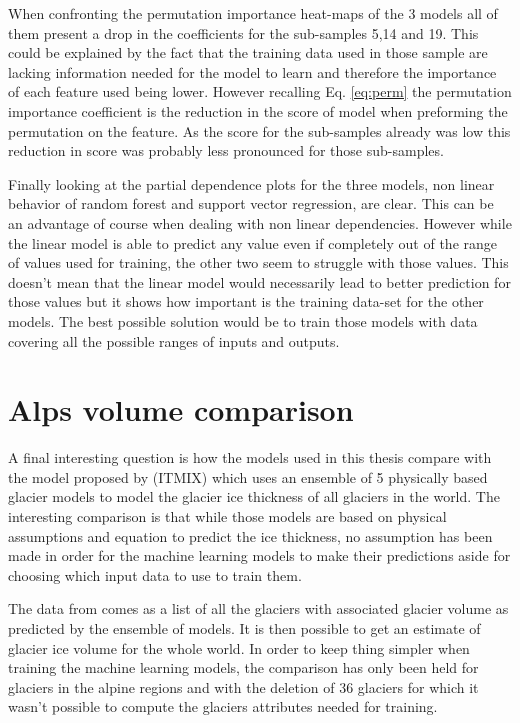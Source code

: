 When confronting the permutation importance heat-maps of the 3 models all of them present a drop in the coefficients for the sub-samples 5,14 and 19. This could be explained by the fact that the training data used in those sample are lacking information needed for the model to learn and therefore the importance of each feature used being lower. However recalling Eq. \ref{eq:perm} the permutation importance coefficient is the reduction in the score of model when preforming the permutation on the feature. As the score for the sub-samples already was low this reduction in score was probably less pronounced for those sub-samples. 

Finally looking at the partial dependence plots for the three models, non linear behavior of random forest and support vector regression, are clear. This can be an advantage of course when dealing with non linear dependencies. However while the linear model is able to predict any value even if completely out of the range of values used for training, the other two seem to struggle with those values. This doesn't mean that the linear model would necessarily lead to better prediction for those values but it shows how important is the training data-set for the other models. The best possible solution would be to train those models with data covering all the possible ranges of inputs and outputs.

\section{Alps volume comparison}\label{disc-alps}
A final interesting question is how the models used in this thesis compare with the model proposed by \citet{Farinotti2019} (ITMIX) which uses an ensemble of 5 physically based glacier models to model the glacier ice thickness of all glaciers in the world. The interesting comparison is that while those models are based on physical assumptions and  equation to predict the ice thickness, no assumption has been made in order for the machine learning models to make their predictions aside for choosing which input data to use to train them.
 
The data from \citet{Farinotti2019} comes as a list of all the glaciers with associated glacier volume as predicted by the ensemble of models. It is then possible to get an estimate of glacier ice volume for the whole world.
In order to keep thing simpler when training the machine learning models, the comparison has only been held for glaciers in the alpine regions and with the deletion of 36 glaciers for which it wasn't possible to compute the glaciers attributes needed for training.

